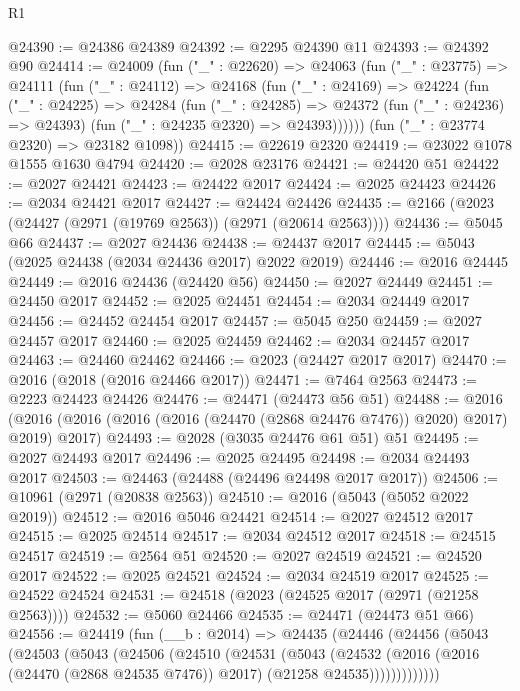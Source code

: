 \begin{lexlean}{R1}
\begin{coremodule}
@24390 := @24386 @24389
@24392 := @2295 @24390 @11
@24393 := @24392 @90
@24414 := @24009
    (fun ("_" : @22620) =>
    @24063
      (fun ("_" : @23775) =>
      @24111
        (fun ("_" : @24112) =>
        @24168
          (fun ("_" : @24169) =>
          @24224
            (fun ("_" : @24225) =>
            @24284
              (fun ("_" : @24285) =>
              @24372 (fun ("_" : @24236) => @24393) (fun ("_" : @24235 @2320) => @24393))))))
      (fun ("_" : @23774 @2320) => @23182 @1098))
@24415 := @22619 @2320
@24419 := @23022 @1078 @1555 @1630 @4794
@24420 := @2028 @23176
@24421 := @24420 @51
@24422 := @2027 @24421
@24423 := @24422 @2017
@24424 := @2025 @24423
@24426 := @2034 @24421 @2017
@24427 := @24424 @24426
@24435 := @2166 (@2023 (@24427 (@2971 (@19769 @2563)) (@2971 (@20614 @2563))))
@24436 := @5045 @66
@24437 := @2027 @24436
@24438 := @24437 @2017
@24445 := @5043 (@2025 @24438 (@2034 @24436 @2017) @2022 @2019)
@24446 := @2016 @24445
@24449 := @2016 @24436 (@24420 @56)
@24450 := @2027 @24449
@24451 := @24450 @2017
@24452 := @2025 @24451
@24454 := @2034 @24449 @2017
@24456 := @24452 @24454 @2017
@24457 := @5045 @250
@24459 := @2027 @24457 @2017
@24460 := @2025 @24459
@24462 := @2034 @24457 @2017
@24463 := @24460 @24462
@24466 := @2023 (@24427 @2017 @2017)
@24470 := @2016 (@2018 (@2016 @24466 @2017))
@24471 := @7464 @2563
@24473 := @2223 @24423 @24426
@24476 := @24471 (@24473 @56 @51)
@24488 := @2016
    (@2016 (@2016 (@2016 (@2016 (@24470 (@2868 @24476 @7476)) @2020) @2017) @2019) @2017)
@24493 := @2028 (@3035 @24476 @61 @51) @51
@24495 := @2027 @24493 @2017
@24496 := @2025 @24495
@24498 := @2034 @24493 @2017
@24503 := @24463 (@24488 (@24496 @24498 @2017 @2017))
@24506 := @10961 (@2971 (@20838 @2563))
@24510 := @2016 (@5043 (@5052 @2022 @2019))
@24512 := @2016 @5046 @24421
@24514 := @2027 @24512 @2017
@24515 := @2025 @24514
@24517 := @2034 @24512 @2017
@24518 := @24515 @24517
@24519 := @2564 @51
@24520 := @2027 @24519
@24521 := @24520 @2017
@24522 := @2025 @24521
@24524 := @2034 @24519 @2017
@24525 := @24522 @24524
@24531 := @24518 (@2023 (@24525 @2017 (@2971 (@21258 @2563))))
@24532 := @5060 @24466
@24535 := @24471 (@24473 @51 @66)
@24556 := @24419
    (fun (__b : @2014) =>
    @24435
      (@24446
        (@24456
          (@5043
            (@24503
              (@5043
                (@24506
                  (@24510
                    (@24531
                      (@5043
                        (@24532
                          (@2016
                            (@2016 (@24470 (@2868 @24535 @7476)) @2017)
                            (@21258 @24535)))))))))))))

\end{coremodule}
\end{lexlean}
